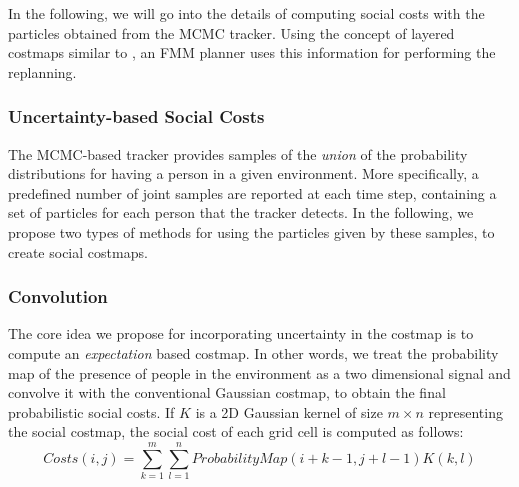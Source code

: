 In the following, we will go into the details of computing social costs with the particles obtained from the MCMC tracker. Using the concept of layered costmaps similar to \cite{lu2014iros}, an FMM planner uses this information for performing the replanning.%
\subsubsection{Uncertainty-based Social Costs}

The MCMC-based tracker provides samples of the \textit{union} of the probability distributions for having a person in a given environment. More specifically, a predefined number of joint samples are reported at each time step, containing a set of particles for each person that the tracker detects. In the following, we propose two types of methods for using the particles given by these samples, to create social costmaps.  


\subsubsection*{\normalfont \textbf{Convolution}}

The core idea we propose for incorporating uncertainty in the costmap is to compute an \textit{expectation} based costmap. In other words, we treat the probability map of the presence of people in the environment as a two dimensional signal and convolve it with the conventional Gaussian costmap, to obtain the final probabilistic social costs. If $K$ is a 2D Gaussian kernel of size $m\times n$ representing the social costmap, the social cost of each grid cell is computed as follows:   
\begin{equation}
Costs (i,j) = \sum_{k=1}^{m}\sum_{l=1}^{n}ProbabilityMap(i
+k-1, j+l-1)K(k,l)
\end{equation}

